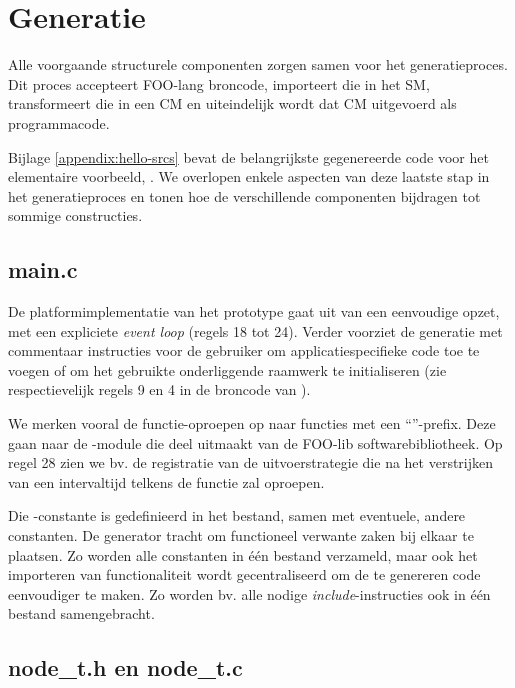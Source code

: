 
\section{Generatie}
\label{section:generation}

Alle voorgaande structurele componenten zorgen samen voor het generatieproces.
Dit proces accepteert FOO-lang broncode, importeert die in het SM,
transformeert die in een CM en uiteindelijk wordt dat CM uitgevoerd als
programmacode.

Bijlage \ref{appendix:hello-srcs} bevat de belangrijkste gegenereerde code voor
het elementaire voorbeeld, . We overlopen enkele aspecten van
deze laatste stap in het generatieproces en tonen hoe de verschillende
componenten bijdragen tot sommige constructies.

\subsection{main.c}

De platformimplementatie van het prototype gaat uit van een eenvoudige opzet,
met een expliciete \emph{event loop} (regels 18 tot 24). Verder voorziet de
generatie met commentaar instructies voor de gebruiker om applicatiespecifieke
code toe te voegen of om het gebruikte onderliggende raamwerk te initialiseren
(zie respectievelijk regels 9 en 4 in de broncode van ).

We merken vooral de functie-oproepen op naar functies met een
``''-prefix. Deze gaan naar de -module die deel
uitmaakt van de FOO-lib softwarebibliotheek. Op regel 28 zien we bv. de
registratie van de uitvoerstrategie die na het verstrijken van een intervaltijd
telkens de functie  zal oproepen.

Die -constante is gedefinieerd in het  bestand,
samen met eventuele, andere constanten. De generator tracht om functioneel
verwante zaken bij elkaar te plaatsen. Zo worden alle constanten in \'e\'en
bestand verzameld, maar ook het importeren van functionaliteit wordt
gecentraliseerd om de te genereren code eenvoudiger te maken. Zo worden bv.
alle nodige \emph{include}-instructies ook in \'e\'en  bestand
samengebracht.

\subsection{node\_t.h en node\_t.c}

